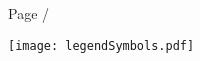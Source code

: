 \noindent \large{\textbf{}} \hfill \small{Page \thepage/\pageref{LastPage}}

\vspace{0.5em}
\centerline{\texttt{[image: legendSymbols.pdf]}}
\vspace{0.1em}